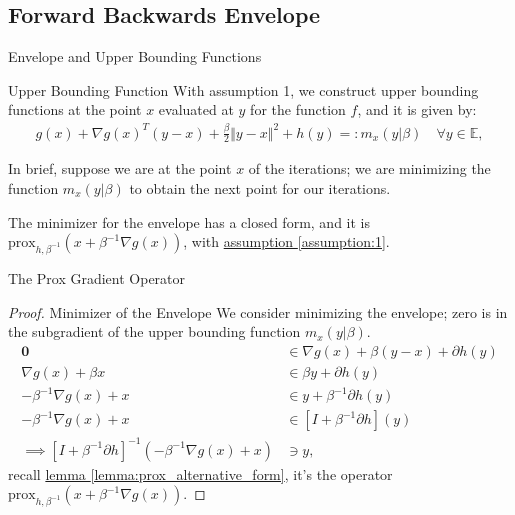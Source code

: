 \documentclass[11pt]{beamer}
\begin{document}
    \subsection{Forward Backwards Envelope}
        \begin{frame}{Envelope and Upper Bounding Functions}
            \begin{block}{Upper Bounding Function}
                With assumption 1, we construct upper bounding functions at the point $x$ evaluated at $y$ for the function $f$, and it is given by: 
                \begin{align*}
                    g(x) + \nabla g(x)^T(y - x) + \frac{\beta}{2} \Vert y - x\Vert^2
                    + h(y) =: m_x(y|\beta) \quad \forall y \in \mathbb E, 
                \end{align*}    
            \end{block}
            In brief, suppose we are at the point $x$ of the iterations; we are minimizing the function $m_x(y|\beta)$ to obtain the next point for our iterations.
            \begin{theorem}\label{thm:minimizer_envelope}
                The minimizer for the envelope has a closed form, and it is $\text{prox}_{h, \beta^{-1}}(x + \beta^{-1}\nabla g(x))$, with \hyperref[assumption:1]{assumption \ref*{assumption:1}}. 
            \end{theorem}
        \end{frame}
        \begin{frame}{The Prox Gradient Operator}
            \begin{proof}{Minimizer of the Envelope}
                We consider minimizing the envelope; zero is in the subgradient of the upper bounding function $m_x(y|\beta)$. 
                \begin{align*}
                    \mathbf 0 &\in 
                    \nabla g(x) + {\beta}(y - x) + \partial h(y)
                    \\
                    \nabla g(x) + \beta x & \in
                    \beta y + \partial h(y)
                    \\
                    -\beta^{-1} \nabla g(x) + x &\in y + \beta^{-1} \partial h(y)
                    \\
                    -\beta^{-1} \nabla g(x) + x &\in [I + \beta^{-1} \partial h](y)
                    \\
                    \implies
                    [I + \beta^{-1}\partial h]^{-1}(- \beta^{-1} \nabla g(x) + x) 
                    & \ni y,
                \end{align*}
                recall \hyperref[lemma:prox_alternative_form]{lemma \ref*{lemma:prox_alternative_form}}, it's the operator $\text{prox}_{h, \beta^{-1}}(x + \beta^{-1}\nabla g(x))$. 
            \end{proof}
        \end{frame}
\end{document}
